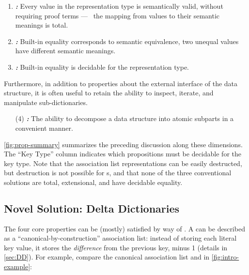 \newcommand{\designGoal}[1]
  {\textbf{\emph{#1:}}}

\begin{enumerate}

\item
%
\designGoal{\SemTot}
%
Every value in the representation type is semantically valid, without requiring proof terms --- \ie{}~the mapping from values to their semantic meanings is total.

\item
%
\designGoal{\SemInj}
%
Built-in equality corresponds to semantic equivalence, \ie{} two unequal values have different semantic meanings.

\item
%
\designGoal{\EqDec}
%
Built-in equality is decidable for the representation type.

\end{enumerate}

Furthermore, in addition to properties about the external interface of the data structure, it is often useful to retain the ability to inspect, iterate, and manipulate sub-dictionaries.
%

\begin{enumerate}

\item[(4)]
%
\designGoal{\EzDstr}
%
The ability to decompose a data structure into atomic subparts in a convenient manner.



\end{enumerate}



\autoref{fig:prop-summary} summarizes the preceding discussion along these dimensions.
%
The ``Key Type'' column indicates which propositions must be decidable for the key type.
%
Note that the association list representations can be easily destructed, but destruction is not possible for \fpf{}s,
%
and that none of the three conventional solutions are total, extensional, and have decidable equality.

\subsection{Novel Solution: Delta Dictionaries}
%
The four core properties can be (mostly) satisfied by way of \emph{\dds{}}.
%
A \dd{} can be described as a ``canonical-by-construction'' association list: instead of storing each literal key value, it stores the \emph{difference} from the previous key, minus 1 (details in \autoref{sec:DD}).
%
For example, compare the canonical association list and \dd{} in \autoref{fig:intro-example}:

